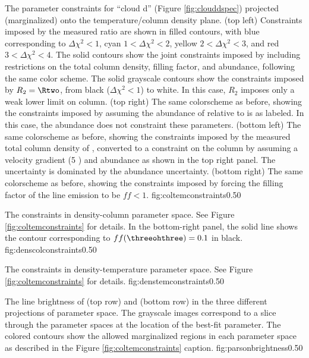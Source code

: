 {The parameter constraints for ``cloud d'' (Figure \ref{fig:clouddspec})
projected (marginalized) onto the temperature/column density plane.\newline
(top left) Constraints imposed by the measured ratio \Rone are shown in filled contours,
with blue corresponding to $\Delta\chi^2 < 1$, cyan $1 < \Delta\chi^2 < 2$,
yellow $2 < \Delta\chi^2 < 3$, and red $3 < \Delta\chi^2 < 4$.  The solid
contours show the joint constraints imposed by including restrictions on the
total column density, filling factor, and abundance, following the same color
scheme.  The solid grayscale contours show the constraints imposed by
$R_2=\Rtwo$, from black ($\Delta\chi^2 < 1$) to white.  In this case, $R_2$
imposes only a weak lower limit on column. \newline
(top right) The same colorscheme as before, showing the constraints imposed by
assuming the abundance of \para relative to \hh is as labeled.  In this case,
the abundance does not constraint these parameters. \newline
(bottom left) The same colorscheme as before, showing the constraints imposed
by the measured total column density of \hh, converted to a constraint on the
\para column by assuming a velocity gradient (5 \kms \perpc) and abundance as
shown in the top right panel.  The uncertainty is dominated by the abundance
uncertainty.  \newline
(bottom right) The same colorscheme as before, showing the constraints imposed
by forcing the filling factor of the line emission to be $ff < 1$.
}
{fig:coltemconstraints}{0.5}{0}

{The constraints in density-column parameter space.
See Figure \ref{fig:coltemconstraints} for details.  In the bottom-right panel, the
solid line shows the contour corresponding to $ff(\threeohthree)=0.1$ in
black.}
{fig:denscolconstraints}{0.5}{0}

{The constraints in density-temperature parameter space.
See Figure \ref{fig:coltemconstraints} for details.}
{fig:denstemconstraints}{0.5}{0}

{The line brightness of \para \threeohthree (top row) and \para \threetwoone
(bottom row) in the three different projections of parameter space.  The
grayscale images correspond to a slice through the parameter spaces at the
location of the best-fit parameter.  The colored contours show the allowed
marginalized regions in each parameter space as described in the
Figure \ref{fig:coltemconstraints} caption.}
{fig:parsonbrightness}{0.5}{0}

